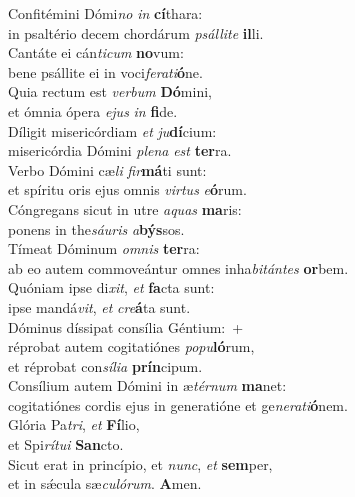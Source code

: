 \evenverse Confitémini Dómi\textit{no} \textit{in} \textbf{cí}thara:~\*\\
\evenverse in psaltério decem chordárum \textit{psál}\textit{li}\textit{te} \textbf{il}li.\\
\oddverse Cantáte ei cán\textit{ti}\textit{cum} \textbf{no}vum:~\*\\
\oddverse bene psállite ei in voci\textit{fe}\textit{ra}\textit{ti}\textbf{ó}ne.\\
\evenverse Quia rectum est \textit{ver}\textit{bum} \textbf{Dó}mini,~\*\\
\evenverse et ómnia ópera \textit{e}\textit{jus} \textit{in} \textbf{fi}de.\\
\oddverse Díligit misericórdiam \textit{et} \textit{ju}\textbf{dí}cium:~\*\\
\oddverse misericórdia Dómini \textit{ple}\textit{na} \textit{est} \textbf{ter}ra.\\
\evenverse Verbo Dómini cæ\textit{li} \textit{fir}\textbf{má}ti sunt:~\*\\
\evenverse et spíritu oris ejus omnis \textit{vir}\textit{tus} \textit{e}\textbf{ó}rum.\\
\oddverse Cóngregans sicut in utre \textit{a}\textit{quas} \textbf{ma}ris:~\*\\
\oddverse ponens in the\textit{sáu}\textit{ris} \textit{a}\textbf{býs}sos.\\
\evenverse Tímeat Dóminum \textit{om}\textit{nis} \textbf{ter}ra:~\*\\
\evenverse ab eo autem commoveántur omnes inha\textit{bi}\textit{tán}\textit{tes} \textbf{or}bem.\\
\oddverse Quóniam ipse di\textit{xit}, \textit{et} \textbf{fa}cta sunt:~\*\\
\oddverse ipse mandá\textit{vit}, \textit{et} \textit{cre}\textbf{á}ta sunt.\\
\evenverse Dóminus díssipat consília Géntium:~+\\
\evenverse  réprobat autem cogitatiónes \textit{po}\textit{pu}\textbf{ló}rum,~\*\\
\evenverse et réprobat con\textit{sí}\textit{li}\textit{a} \textbf{prín}cipum.\\
\oddverse Consílium autem Dómini in æ\textit{tér}\textit{num} \textbf{ma}net:~\*\\
\oddverse cogitatiónes cordis ejus in generatióne et ge\textit{ne}\textit{ra}\textit{ti}\textbf{ó}nem.\\
\evenverse Glória Pa\textit{tri}, \textit{et} \textbf{Fí}lio,~\*\\
\evenverse et Spi\textit{rí}\textit{tu}\textit{i} \textbf{San}cto.\\
\oddverse Sicut erat in princípio, et \textit{nunc}, \textit{et} \textbf{sem}per,~\*\\
\oddverse et in sǽcula sæ\textit{cu}\textit{ló}\textit{rum}. \textbf{A}men.\\
